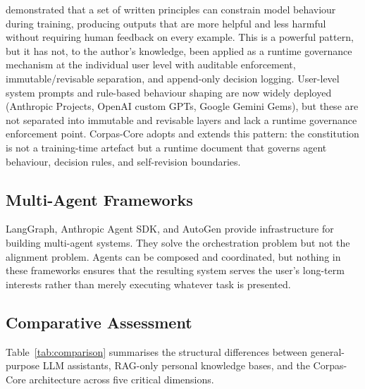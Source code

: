 \documentclass[11pt,a4paper]{article}
\begin{document}
\citet{bai2022constitutional} demonstrated that a set of written principles can constrain model behaviour during training, producing outputs that are more helpful and less harmful without requiring human feedback on every example. This is a powerful pattern, but it has not, to the author's knowledge, been applied as a runtime governance mechanism at the individual user level with auditable enforcement, immutable/revisable separation, and append-only decision logging. User-level system prompts and rule-based behaviour shaping are now widely deployed (Anthropic Projects, OpenAI custom GPTs, Google Gemini Gems), but these are not separated into immutable and revisable layers and lack a runtime governance enforcement point. Corpas-Core adopts and extends this pattern: the constitution is not a training-time artefact but a runtime document that governs agent behaviour, decision rules, and self-revision boundaries.

\subsection{Multi-Agent Frameworks}

LangGraph, Anthropic Agent SDK, and AutoGen \citep{wu2023autogen} provide infrastructure for building multi-agent systems. They solve the orchestration problem but not the alignment problem. Agents can be composed and coordinated, but nothing in these frameworks ensures that the resulting system serves the user's long-term interests rather than merely executing whatever task is presented.

\subsection{Comparative Assessment}

Table~\ref{tab:comparison} summarises the structural differences between general-purpose LLM assistants, RAG-only personal knowledge bases, and the Corpas-Core architecture across five critical dimensions.
\end{document}
